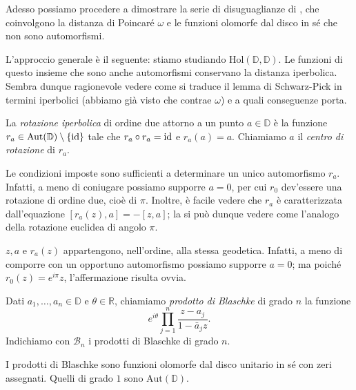 Adesso possiamo procedere a dimostrare la serie di disuguaglianze di \cite{BM}, che coinvolgono la distanza di Poincaré $\omega$ e le funzioni olomorfe dal disco in sé che non sono automorfismi.

L'approccio generale è il seguente: stiamo studiando $\text{Hol}(\mathbb{D},\mathbb{D})$. Le funzioni di questo insieme che sono anche automorfismi conservano la distanza iperbolica. Sembra dunque ragionevole vedere come si traduce il lemma di Schwarz-Pick in termini iperbolici (abbiamo già visto che contrae $\omega$) e a quali conseguenze porta.

\begin{defn}
  La \textit{rotazione iperbolica} di ordine due attorno a un punto $a \in \mathbb{D}$ è la funzione $r_a \in \text{Aut}(\mathbb{D})\setminus\{\operatorname{id}\}$ tale che $r_a \circ r_a=\operatorname{id}$ e $r_a(a)=a$.
  Chiamiamo $a$ il \textit{centro di rotazione} di $r_a$.
\end{defn}

\begin{oss}
  Le condizioni imposte sono sufficienti a determinare un unico automorfismo $r_a$. Infatti, a meno di coniugare possiamo supporre $a=0$, per cui $r_0$ dev'essere una rotazione di ordine due, cioè di $\pi$. Inoltre, è facile vedere che $r_a$ è caratterizzata dall'equazione $[r_a(z),a]=-[z,a]$; la si può dunque vedere come l'analogo della rotazione euclidea di angolo $\pi$.
\end{oss}

\begin{oss} \label{rotegeo}
  $z, a$ e $r_a(z)$ appartengono, nell'ordine, alla stessa geodetica. Infatti, a meno di comporre con un opportuno automorfismo possiamo supporre $a=0$; ma poiché $r_0(z)=e^{i\pi}z$, l'affermazione risulta ovvia.
\end{oss}

\begin{defn}
  Dati $a_1,\dots,a_n \in \mathbb{D}$ e $\theta \in \mathbb{R}$, chiamiamo \textit{prodotto di Blaschke} di grado $n$ la funzione
  $$e^{i\theta}\prod_{j=1}^n \frac{z-a_j}{1-\bar{a}_jz}.$$
  Indichiamo con $\mathcal{B}_n$ i prodotti di Blaschke di grado $n$.
\end{defn}

\begin{oss}
  I prodotti di Blaschke sono funzioni olomorfe dal disco unitario in sé con zeri assegnati. Quelli di grado $1$ sono $\text{Aut}(\mathbb{D})$.
\end{oss}

